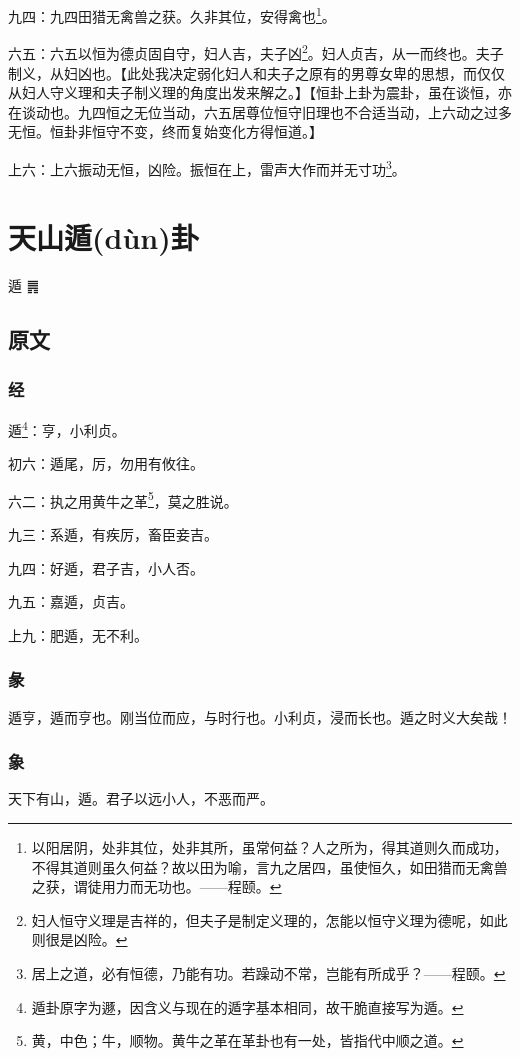 \documentclass[12pt,oneside]{book}
\begin{document}
九四：九四田猎无禽兽之获。久非其位，安得禽也\footnote{以阳居阴，处非其位，处非其所，虽常何益？人之所为，得其道则久而成功，不得其道则虽久何益？故以田为喻，言九之居四，虽使恒久，如田猎而无禽兽之获，谓徒用力而无功也。——程颐。}。

六五：六五以恒为德贞固自守，妇人吉，夫子凶\footnote{妇人恒守义理是吉祥的，但夫子是制定义理的，怎能以恒守义理为德呢，如此则很是凶险。}。妇人贞吉，从一而终也。夫子制义，从妇凶也。【此处我决定弱化妇人和夫子之原有的男尊女卑的思想，而仅仅从妇人守义理和夫子制义理的角度出发来解之。】【恒卦上卦为震卦，虽在谈恒，亦在谈动也。九四恒之无位当动，六五居尊位恒守旧理也不合适当动，上六动之过多无恒。恒卦非恒守不变，终而复始变化方得恒道。】

上六：上六振动无恒，凶险。振恒在上，雷声大作而并无寸功\footnote{居上之道，必有恒德，乃能有功。若躁动不常，岂能有所成乎？——程颐。}。


\chapter{天山遁(dùn)卦}
遁 {\Large ䷠}

\section{原文}

\subsection{经}
遁\footnote{遁卦原字为遯，因含义与现在的遁字基本相同，故干脆直接写为遁。}：亨，小利贞。

初六：遁尾，厉，勿用有攸往。

六二：执之用黄牛之革\footnote{黄，中色；牛，顺物。黄牛之革在革卦也有一处，皆指代中顺之道。}，莫之胜说。

九三：系遁，有疾厉，畜臣妾吉。

九四：好遁，君子吉，小人否。

九五：嘉遁，贞吉。

上九：肥遁，无不利。

\subsection{彖}
遁亨，遁而亨也。刚当位而应，与时行也。小利贞，浸而长也。遁之时义大矣哉！

\subsection{象}
天下有山，遁。君子以远小人，不恶而严。
\end{document}
